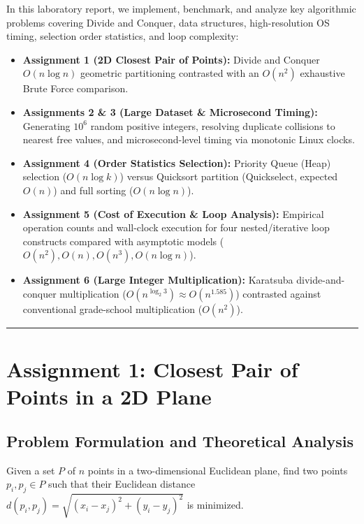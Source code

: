 \documentclass[12pt]{article}
\begin{document}
In this laboratory report, we implement, benchmark, and analyze key algorithmic problems covering Divide and Conquer, data structures, high-resolution OS timing, selection order statistics, and loop complexity:
\begin{itemize}
    \item \textbf{Assignment 1 (2D Closest Pair of Points):} Divide and Conquer $O(n \log n)$ geometric partitioning contrasted with an $O(n^2)$ exhaustive Brute Force comparison.
    \item \textbf{Assignments 2 \& 3 (Large Dataset \& Microsecond Timing):} Generating $10^6$ random positive integers, resolving duplicate collisions to nearest free values, and microsecond-level timing via monotonic Linux clocks.
    \item \textbf{Assignment 4 (Order Statistics Selection):} Priority Queue (Heap) selection ($O(n \log k)$) versus Quicksort partition (Quickselect, expected $O(n)$) and full sorting ($O(n \log n)$).
    \item \textbf{Assignment 5 (Cost of Execution \& Loop Analysis):} Empirical operation counts and wall-clock execution for four nested/iterative loop constructs compared with asymptotic models ($O(n^2), O(n), O(n^3), O(n \log n)$).
    \item \textbf{Assignment 6 (Large Integer Multiplication):} Karatsuba divide-and-conquer multiplication ($O(n^{\log_2 3}) \approx O(n^{1.585})$) contrasted against conventional grade-school multiplication ($O(n^2)$).
\end{itemize}

\vspace{0.2cm}
\hrule
\vspace{0.3cm}

\section{Assignment 1: Closest Pair of Points in a 2D Plane}

\subsection{Problem Formulation and Theoretical Analysis}
Given a set $P$ of $n$ points in a two-dimensional Euclidean plane, find two points $p_i, p_j \in P$ such that their Euclidean distance $d(p_i, p_j) = \sqrt{(x_i - x_j)^2 + (y_i - y_j)^2}$ is minimized.
\end{document}
